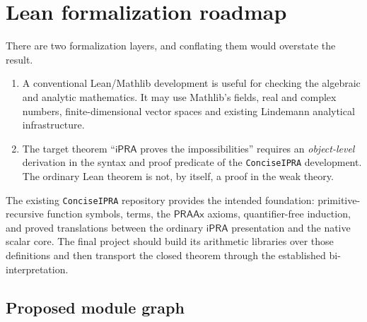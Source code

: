 \documentclass[11pt]{article}
\newcommand{\ipra}{\mathsf{iPRA}}
\newcommand{\code}[1]{\texttt{\detokenize{#1}}}
\begin{document}
\section{Lean formalization roadmap}

There are two formalization layers, and conflating them would overstate the result.

\begin{enumerate}
\item A conventional Lean/Mathlib development is useful for checking the algebraic and analytic mathematics.  It may use Mathlib's fields, real and complex numbers, finite-dimensional vector spaces and existing Lindemann analytical infrastructure.
\item The target theorem ``$\ipra$ proves the impossibilities'' requires an \emph{object-level} derivation in the syntax and proof predicate of the \texttt{ConciseIPRA} development.  The ordinary Lean theorem is not, by itself, a proof in the weak theory.
\end{enumerate}

The existing \texttt{ConciseIPRA} repository provides the intended foundation: primitive-recursive function symbols, terms, the $\mathsf{PRAAx}$ axioms, quantifier-free induction, and proved translations between the ordinary $\ipra$ presentation and the native scalar core.  The final project should build its arithmetic libraries over those definitions and then transport the closed theorem through the established bi-interpretation.

\subsection{Proposed module graph}

\begin{center}
\end{center}
\end{document}
